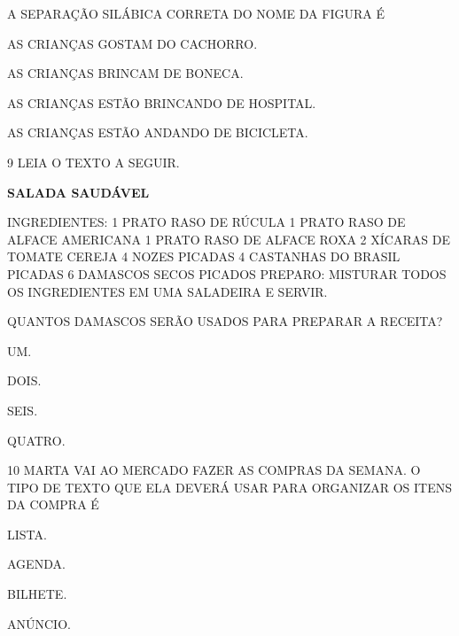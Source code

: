 A SEPARAÇÃO SILÁBICA CORRETA DO NOME DA FIGURA É

\begin{escolha}

\item AS CRIANÇAS GOSTAM DO CACHORRO.

\item AS CRIANÇAS BRINCAM DE BONECA.

\item AS CRIANÇAS ESTÃO BRINCANDO DE HOSPITAL.

\item AS CRIANÇAS ESTÃO ANDANDO DE BICICLETA.

\end{escolha}

\num{9} LEIA O TEXTO A SEGUIR.

\begin{myquote}
\textbf{SALADA SAUDÁVEL}

INGREDIENTES:
1 PRATO RASO DE RÚCULA
1 PRATO RASO DE ALFACE AMERICANA 
1 PRATO RASO DE ALFACE ROXA
2 XÍCARAS DE TOMATE CEREJA
4 NOZES PICADAS
4 CASTANHAS DO BRASIL PICADAS 
6 DAMASCOS SECOS PICADOS
PREPARO:
MISTURAR TODOS OS INGREDIENTES EM UMA SALADEIRA E SERVIR.

\end{myquote}

QUANTOS DAMASCOS SERÃO USADOS PARA PREPARAR A RECEITA?

\begin{escolha}

\item UM.

\item DOIS.

\item SEIS.

\item QUATRO.

\end{escolha}

\num{10} MARTA VAI AO MERCADO FAZER AS COMPRAS DA SEMANA.
O TIPO DE TEXTO QUE ELA DEVERÁ USAR PARA ORGANIZAR OS ITENS DA COMPRA É

\begin{escolha}

\item LISTA.

\item AGENDA.

\item BILHETE.

\item ANÚNCIO.

\end{escolha}

